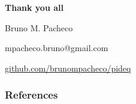 \documentclass[t]{beamer}
\begin{document}
{
\begin{frame}
\vspace{15mm}
\begin{center}
\textcolor{cinza}{
\textbf{Thank you all}
}
\end{center}
\vspace{-6mm}
\begin{center}
\textcolor{cinza}{\scriptsize{
	Bruno M. Pacheco
}}
\end{center}
\vspace{-6mm}
\begin{center}
\textcolor{cinza}{\scriptsize{
mpacheco.bruno@gmail.com
}}
\end{center}
\vspace{-6mm}
\begin{center}
\textcolor{cinza}{\scriptsize{
\href{https://github.com/brunompacheco/pideq}{github.com/brunompacheco/pideq}
}}
\end{center}
\end{frame}
}

\begin{frame}
    \frametitle{References}
    \printbibliography
\end{frame}
\end{document}
